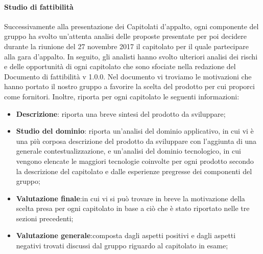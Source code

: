 \paragraph{Studio di fattibilità}\Spazio
Successivamente alla presentazione dei Capitolati d'appalto, ogni componente del gruppo ha svolto un'attenta analisi delle proposte presentate per poi decidere durante la riunione del 27 novembre 2017 il capitolato per il quale partecipare alla gara d'appalto. In seguito, gli analisti hanno svolto ulteriori analisi dei rischi e delle opportunità di ogni capitolato che sono sfociate nella redazione del Documento di fattibilità v 1.0.0. Nel documento vi troviamo le motivazioni che hanno portato il nostro gruppo a favorire la scelta del prodotto per cui proporci come fornitori. Inoltre, riporta per ogni capitolato le seguenti informazioni:
\begin{itemize}
 	\item\textbf{{Descrizione}}: riporta una breve sintesi del prodotto da sviluppare;
 	\item\textbf{{Studio del dominio}}: riporta un'analisi del dominio applicativo, in cui vi è una più corposa descrizione del prodotto da sviluppare con l'aggiunta di una generale contestualizzazione, e un'analisi del dominio tecnologico, in cui vengono elencate le maggiori tecnologie coinvolte per ogni prodotto secondo la descrizione del capitolato e dalle esperienze pregresse dei componenti del gruppo;
 	\item\textbf{{Valutazione finale}}:in cui vi si può trovare in breve la motivazione della scelta presa per ogni capitolato in base a ciò che è stato riportato nelle tre sezioni precedenti; 		
 	\item\textbf{{Valutazione generale}}:composta dagli aspetti positivi e dagli aspetti negativi trovati discussi dal gruppo riguardo al capitolato in esame;
\end{itemize}
